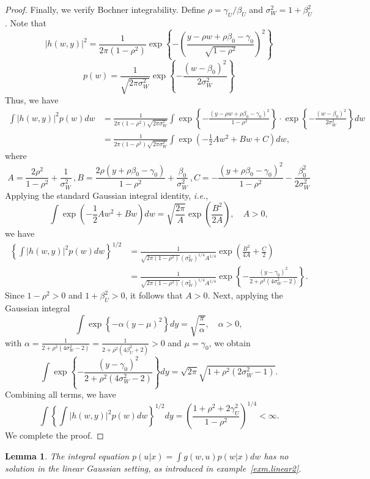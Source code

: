 \documentclass[
  12pt]{article}
\newtheorem{lemma}{Lemma}
\begin{document}
\begin{proof}
Finally, we verify Bochner integrability. Define $\rho = \gamma_U/\beta_U$ and $\sigma_W^2=1+\beta_U^2$. Note that
$$
|h(w,y)|^2 =\frac{1}{2\pi(1-\rho^2)} \exp\left\{- \left(\frac{y - \rho w + \rho\beta_0 - \gamma_0}{\sqrt{1-\rho^2}}\right)^2 \right\}
$$
$$
p(w) = \frac{1}{\sqrt{2\pi\sigma_W^2}} \exp\left\{-\frac{(w-\beta_0)^2}{2\sigma_W^2}\right\}
$$
Thus, we have
\begin{align*}
    \int |h(w,y)|^2 p(w) dw &= \frac{1}{2\pi (1-\rho^2)\sqrt{2\pi \sigma_W^2}}\int \exp\left\{-\frac{(y - \rho w + \rho \beta_0 - \gamma_0)^2}{1-\rho^2}\right\} \cdot  \exp\left\{-\frac{(w-\beta_0)^2}{2\sigma_W^2}\right\} dw\\
    &= \frac{1}{2\pi (1-\rho^2)\sqrt{2\pi \sigma_W^2}}\int \exp\left(-\frac{1}{2}Aw^2+Bw+C\right) dw,
\end{align*}
where 
$$
A = \frac{2\rho^2}{1 - \rho^2} + \frac{1}{\sigma_W^2}\, ,B = \frac{2\rho(y + \rho\beta_0 - \gamma_0)}{1 - \rho^2} + \frac{\beta_0}{\sigma_W^2}\,  ,C = -\frac{(y + \rho\beta_0 - \gamma_0)^2}{1 - \rho^2} - \frac{\beta_0^2}{2\sigma_W^2}
$$
Applying the standard Gaussian integral identity, \emph{i.e.},
$$
\int \exp\left(- \frac{1}{2} A w^2 + B w\right) dw = \sqrt{\frac{2\pi}{A}} \exp\left( \frac{B^2}{2A} \right),\quad A>0,
$$
we have
\begin{align*}
    \left\{\int |h(w,y)|^2 p(w) dw\right\}^{1/2}&= \frac{1}{\sqrt{2\pi (1-\rho^2)} ( \sigma_W^2)^{1/4} A^{1/4}} \exp\left( \frac{B^2}{4A} + \frac{C}{2} \right)\\
    &=  \frac{1}{\sqrt{2\pi (1-\rho^2)} ( \sigma_W^2)^{1/4} A^{1/4}}\exp\left\{ -\frac{(y-\gamma_0)^2}{2+\rho^2(4\sigma_W^2-2)}\right\}.
\end{align*}
Since $1-\rho^2>0$ and $1+\beta_U^2>0$, it follows that $A>0$. Next, applying the Gaussian integral
$$
\int \exp\left\{- \alpha(y-\mu)^2\right\} dy = \sqrt{\frac{\pi}{\alpha}} ,\quad \alpha>0,
$$
with $\alpha=\frac{1}{2+\rho^2(4\sigma_W^2-2)}=\frac{1}{2+\rho^2(4\beta_U^2+2)}>0$ and $\mu = \gamma_0$, we obtain
$$
\int \exp\left\{ -\frac{(y-\gamma_0)^2}{2+\rho^2(4\sigma_W^2-2)}\right\} dy =\sqrt{2\pi}\sqrt{1+\rho^2(2\sigma_W^2-1)}.
$$
Combining all terms, we have
$$
\int \left\{\int |h(w,y)|^2 p(w) dw\right\}^{1/2} dy =\left(\frac{1+\rho^2+2\gamma_U^2}{1-\rho^2}\right)^{1/4} < \infty. 
$$
We complete the proof. 
\end{proof}
 
\begin{lemma}
    The integral equation $p(u|x)=\int g(w,u)p(w|x)dw$ has no solution in the linear Gaussian setting, as introduced in example~\ref{exm.linear2}. 
\end{lemma}
\end{document}
